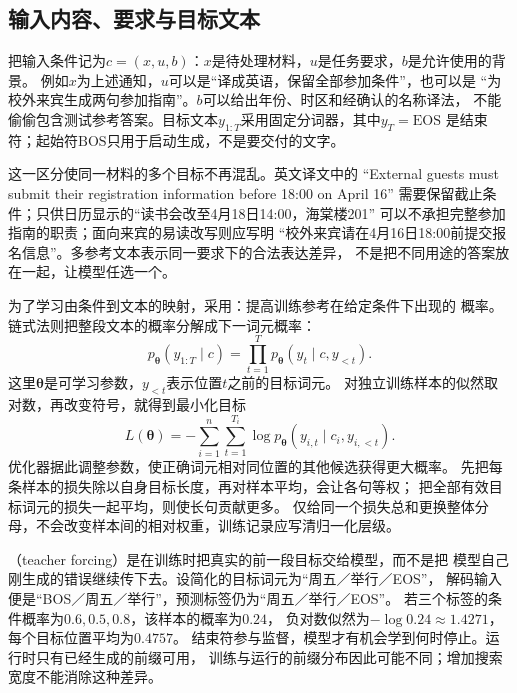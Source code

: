 \subsection{输入内容、要求与目标文本}
\label{sec:nlp-generation-training}

把输入条件记为$c=(x,u,b)$：$x$是待处理材料，$u$是任务要求，$b$是允许使用的背景。
例如$x$为上述通知，$u$可以是“译成英语，保留全部参加条件”，也可以是
“为校外来宾生成两句参加指南”。$b$可以给出年份、时区和经确认的名称译法，
不能偷偷包含测试参考答案。目标文本$y_{1:T}$采用固定分词器，其中$y_T=\mathrm{EOS}$
是结束符；起始符$\mathrm{BOS}$只用于启动生成，不是要交付的文字。

这一区分使同一材料的多个目标不再混乱。英文译文中的
“External guests must submit their registration information before 18:00 on April 16”
需要保留截止条件；只供日历显示的“读书会改至4月18日14:00，海棠楼201”
可以不承担完整参加指南的职责；面向来宾的易读改写则应写明
“校外来宾请在4月16日18:00前提交报名信息”。多参考文本表示同一要求下的合法表达差异，
不是把不同用途的答案放在一起，让模型任选一个。

为了学习由条件到文本的映射，采用：提高训练参考在给定条件下出现的
概率。链式法则把整段文本的概率分解成下一词元概率：
\begin{equation}
  p_{\bm{\theta}}(y_{1:T}\mid c)
  =\prod_{t=1}^{T}p_{\bm{\theta}}(y_t\mid c,y_{<t}).
  \label{eq:nlp-generation-factorization}
\end{equation}
这里$\bm{\theta}$是可学习参数，$y_{<t}$表示位置$t$之前的目标词元。
对独立训练样本的似然取对数，再改变符号，就得到最小化目标
\begin{equation}
  L(\bm{\theta})
  =-\sum_{i=1}^{n}\sum_{t=1}^{T_i}
  \log p_{\bm{\theta}}(y_{i,t}\mid c_i,y_{i,<t}).
  \label{eq:nlp-generation-nll}
\end{equation}
优化器据此调整参数，使正确词元相对同位置的其他候选获得更大概率。
先把每条样本的损失除以自身目标长度，再对样本平均，会让各句等权；
把全部有效目标词元的损失一起平均，则使长句贡献更多。
仅给同一个损失总和更换整体分母，不会改变样本间的相对权重，训练记录应写清归一化层级。

（teacher forcing）是在训练时把真实的前一段目标交给模型，而不是把
模型自己刚生成的错误继续传下去。设简化的目标词元为“周五／举行／EOS”，
解码输入便是“BOS／周五／举行”，预测标签仍为“周五／举行／EOS”。
若三个标签的条件概率为$0.6,0.5,0.8$，该样本的概率为$0.24$，
负对数似然为$-\log0.24\approx1.4271$，每个目标位置平均为$0.4757$。
结束符参与监督，模型才有机会学到何时停止。运行时只有已经生成的前缀可用，
训练与运行的前缀分布因此可能不同；增加搜索宽度不能消除这种差异。

